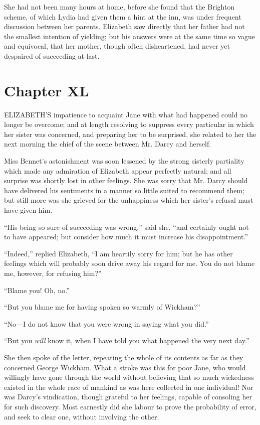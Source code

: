 \documentclass[12pt,openright]{book}
\begin{document}
She had not been many hours at home, before she found that the Brighton scheme, of which Lydia had given them a hint at the inn, was under frequent discussion between her parents. Elizabeth saw directly that her father had not the smallest intention of yielding; but his answers were at the same time so vague and equivocal, that her mother, though often disheartened, had never yet despaired of succeeding at last.

\chapter{Chapter XL}

\noindent  ELIZABETH’S impatience to acquaint Jane with what had happened could no longer be overcome; and at length resolving to suppress every particular in which her sister was concerned, and preparing her to be surprised, she related to her the next morning the chief of the scene between Mr. Darcy and herself.

Miss Bennet’s astonishment was soon lessened by the strong sisterly partiality which made any admiration of Elizabeth appear perfectly natural; and all surprise was shortly lost in other feelings. She was sorry that Mr. Darcy should have delivered his sentiments in a manner so little suited to recommend them; but still more was she grieved for the unhappiness which her sister’s refusal must have given him.

“His being so sure of succeeding was wrong,” said she, “and certainly ought not to have appeared; but consider how much it must increase his disappointment.”

“Indeed,” replied Elizabeth, “I am heartily sorry for him; but he has other feelings which will probably soon drive away his regard for me. You do not blame me, however, for refusing him?”

“Blame you! Oh, no.”

“But you blame me for having spoken so warmly of Wickham?”

“No—I do not know that you were wrong in saying what you did.”

“But you \textit{will} know it, when I have told you what happened the very next day.”

She then spoke of the letter, repeating the whole of its contents as far as they concerned George Wickham. What a stroke was this for poor Jane, who would willingly have gone through the world without believing that so much wickedness existed in the whole race of mankind as was here collected in one individual! Nor was Darcy’s vindication, though grateful to her feelings, capable of consoling her for such discovery. Most earnestly did she labour to prove the probability of error, and seek to clear one, without involving the other.
\end{document}
